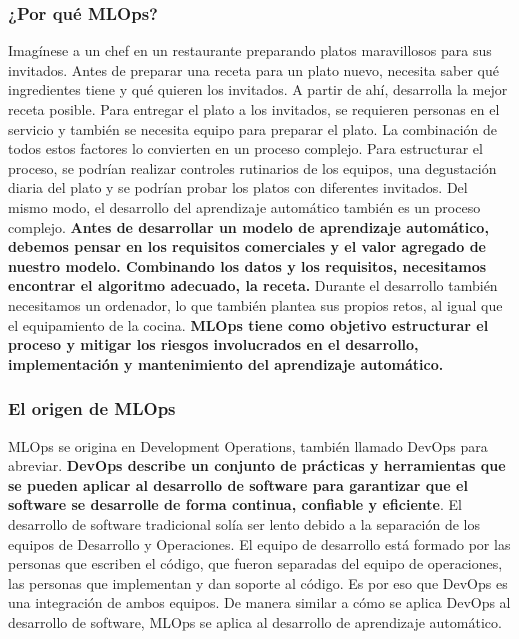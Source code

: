 \documentclass[10pt]{book}
\begin{document}
\subsubsection{¿Por qué MLOps?}
Imagínese a un chef en un restaurante preparando platos maravillosos para sus invitados. Antes de preparar una receta para un plato nuevo, necesita saber qué ingredientes tiene y qué quieren los invitados. A partir de ahí, desarrolla la mejor receta posible. Para entregar el plato a los invitados, se requieren personas en el servicio y también se necesita equipo para preparar el plato. La combinación de todos estos factores lo convierten en un proceso complejo. Para estructurar el proceso, se podrían realizar controles rutinarios de los equipos, una degustación diaria del plato y se podrían probar los platos con diferentes invitados. Del mismo modo, el desarrollo del aprendizaje automático también es un proceso complejo. \textbf{Antes de desarrollar un modelo de aprendizaje automático, debemos pensar en los requisitos comerciales y el valor agregado de nuestro modelo. Combinando los datos y los requisitos, necesitamos encontrar el algoritmo adecuado, la receta.} Durante el desarrollo también necesitamos un ordenador, lo que también plantea sus propios retos, al igual que el equipamiento de la cocina. \textbf{MLOps tiene como objetivo estructurar el proceso y mitigar los riesgos involucrados en el desarrollo, implementación y mantenimiento del aprendizaje automático.}

\subsubsection{El origen de MLOps}
MLOps se origina en Development Operations, también llamado DevOps para abreviar. \textbf{DevOps describe un conjunto de prácticas y herramientas que se pueden aplicar al desarrollo de software para garantizar que el software se desarrolle de forma continua, confiable y eficiente}. El desarrollo de software tradicional solía ser lento debido a la separación de los equipos de Desarrollo y Operaciones. El equipo de desarrollo está formado por las personas que escriben el código, que fueron separadas del equipo de operaciones, las personas que implementan y dan soporte al código. Es por eso que DevOps es una integración de ambos equipos. De manera similar a cómo se aplica DevOps al desarrollo de software, MLOps se aplica al desarrollo de aprendizaje automático.
\end{document}
